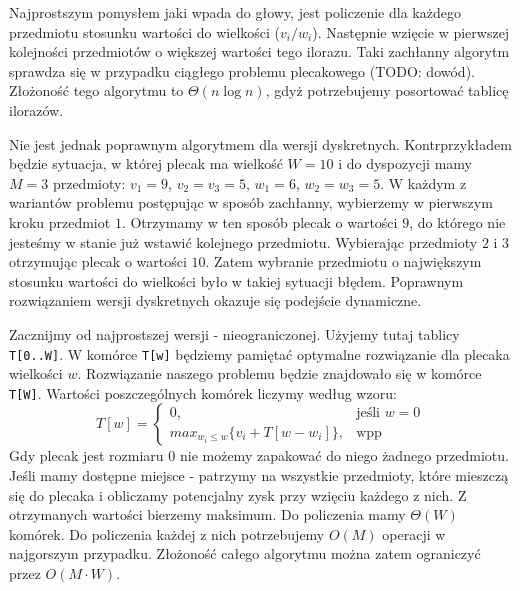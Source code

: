 Najprostszym pomysłem jaki wpada do głowy, jest policzenie dla każdego przedmiotu stosunku wartości do wielkości ($v_i / w_i$).
Następnie wzięcie w pierwszej kolejności przedmiotów o większej wartości tego ilorazu.
Taki zachłanny algorytm sprawdza się w przypadku ciągłego problemu plecakowego (TODO: dowód).
Złożoność tego algorytmu to $\Theta(n \log n)$, gdyż potrzebujemy posortować tablicę ilorazów.

Nie jest jednak poprawnym algorytmem dla wersji dyskretnych.
Kontrprzykładem będzie sytuacja, w której plecak ma wielkość $W = 10$ i do dyspozycji mamy $M = 3$ przedmioty: $v_1=9$, $v_2=v_3=5$, $w_1=6$, $w_2=w_3=5$.
W każdym z wariantów problemu postępując w sposób zachłanny, wybierzemy w pierwszym kroku przedmiot $1$.
Otrzymamy w ten sposób plecak o wartości $9$, do którego nie jesteśmy w stanie już wstawić kolejnego przedmiotu.
Wybierając przedmioty $2$ i $3$ otrzymując plecak o wartości $10$.
Zatem wybranie przedmiotu o największym stosunku wartości do wielkości było w takiej sytuacji błędem.
Poprawnym rozwiązaniem wersji dyskretnych okazuje się podejście dynamiczne.

Zacznijmy od najprostszej wersji - nieograniczonej.
Użyjemy tutaj tablicy \texttt{T[0..W]}.
W komórce \texttt{T[w]} będziemy pamiętać optymalne rozwiązanie dla plecaka wielkości $w$.
Rozwiązanie naszego problemu będzie znajdowało się w komórce \texttt{T[W]}.
Wartości poszczególnych komórek liczymy według wzoru:
\begin{equation*}
  T[w] = \begin{cases}
    0, & \text{jeśli $w = 0$}\\
    max_{w_i \leq w}\{v_i + T[w - w_i]\}, & \text{wpp}
  \end{cases}
\end{equation*}
Gdy plecak jest rozmiaru $0$ nie możemy zapakować do niego żadnego przedmiotu.
Jeśli mamy dostępne miejsce - patrzymy na wszystkie przedmioty, które mieszczą się do plecaka i obliczamy potencjalny zysk przy wzięciu każdego z nich.
Z otrzymanych wartości bierzemy maksimum.
Do policzenia mamy $\Theta(W)$ komórek.
Do policzenia każdej z nich potrzebujemy $O(M)$ operacji w najgorszym przypadku.
Złożoność całego algorytmu można zatem ograniczyć przez $O(M \cdot W)$.

